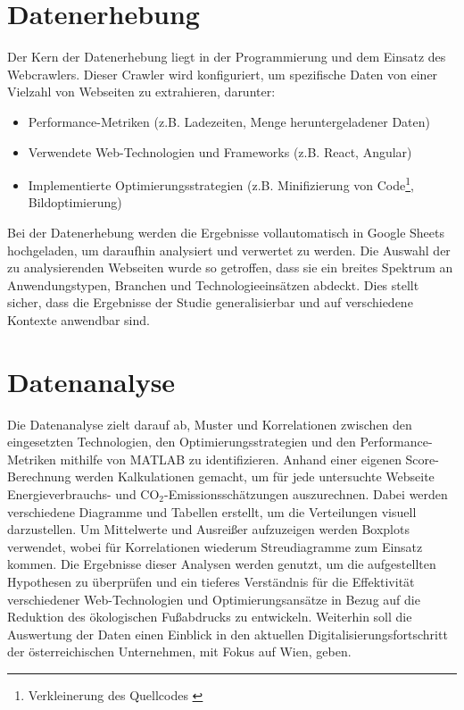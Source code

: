 \documentclass[Bachelor,BIF,german,IEEE]{BASE/twbook}
\begin{document}
\section{Datenerhebung}
Der Kern der Datenerhebung liegt in der Programmierung und dem Einsatz des Webcrawlers. Dieser Crawler wird konfiguriert, um spezifische Daten von einer Vielzahl von Webseiten zu extrahieren, darunter:

\begin{itemize}
    \item Performance-Metriken (z.B. Ladezeiten, Menge heruntergeladener Daten)
    \item Verwendete Web-Technologien und Frameworks (z.B. React, Angular)
    \item Implementierte Optimierungsstrategien (z.B. Minifizierung von Code\footnote{Verkleinerung des Quellcodes \cite{MJS24}}, Bildoptimierung)
\end{itemize}

\noindent Bei der Datenerhebung werden die Ergebnisse vollautomatisch in Google Sheets hochgeladen, um daraufhin analysiert und verwertet zu werden. Die Auswahl der zu analysierenden Webseiten wurde so getroffen, dass sie ein breites Spektrum an Anwendungstypen, Branchen und Technologieeinsätzen abdeckt. Dies stellt sicher, dass die Ergebnisse der Studie generalisierbar und auf verschiedene Kontexte anwendbar sind.

\section{Datenanalyse}
Die Datenanalyse zielt darauf ab, Muster und Korrelationen zwischen den eingesetzten Technologien, den Optimierungsstrategien und den Performance-Metriken mithilfe von MATLAB zu identifizieren. Anhand einer eigenen Score-Berechnung werden Kalkulationen gemacht, um für jede untersuchte Webseite Energieverbrauchs- und CO$_2$-Emissionsschätzungen auszurechnen. Dabei werden verschiedene Diagramme und Tabellen erstellt, um die Verteilungen visuell darzustellen. Um Mittelwerte und Ausreißer aufzuzeigen werden Boxplots verwendet, wobei für Korrelationen wiederum Streudiagramme zum Einsatz kommen. Die Ergebnisse dieser Analysen werden genutzt, um die aufgestellten Hypothesen zu überprüfen und ein tieferes Verständnis für die Effektivität verschiedener Web-Technologien und Optimierungsansätze in Bezug auf die Reduktion des ökologischen Fußabdrucks zu entwickeln. Weiterhin soll die Auswertung der Daten einen Einblick in den aktuellen Digitalisierungsfortschritt der österreichischen Unternehmen, mit Fokus auf Wien, geben.
\end{document}
